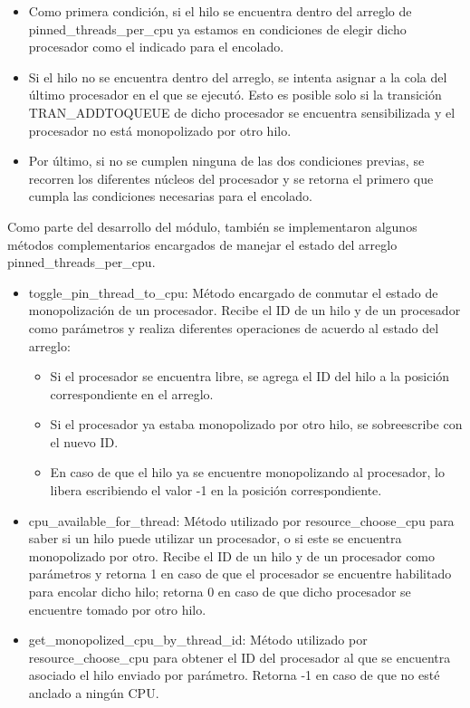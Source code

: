 \begin{itemize}
    \item Como primera condición, si el hilo se encuentra dentro del arreglo de pinned\_threads\_per\_cpu ya estamos en condiciones de elegir dicho procesador como el indicado para el encolado.
    \item Si el hilo no se encuentra dentro del arreglo, se intenta asignar a la cola del último procesador en el que se ejecutó. Esto es posible solo si la transición TRAN\_ADDTOQUEUE de dicho procesador se encuentra sensibilizada y el procesador no está monopolizado por otro hilo.
    \item Por último, si no se cumplen ninguna de las dos condiciones previas, se recorren los diferentes núcleos del procesador y se retorna el primero que cumpla las condiciones necesarias para el encolado.
\end{itemize}

Como parte del desarrollo del módulo, también se implementaron algunos métodos complementarios encargados de manejar el estado del arreglo  pinned\_threads\_per\_cpu.

\begin{itemize}
    \item toggle\_pin\_thread\_to\_cpu: Método encargado de conmutar el estado de monopolización de un procesador. Recibe el ID de un hilo y de un procesador como parámetros y realiza diferentes operaciones de acuerdo al estado del arreglo:
    \begin{itemize}
        \item Si el procesador se encuentra libre, se agrega el ID del hilo a la posición correspondiente en el arreglo.
        \item Si el procesador ya estaba monopolizado por otro hilo, se sobreescribe con el nuevo ID.
        \item En caso de que el hilo ya se encuentre monopolizando al procesador, lo libera escribiendo el valor -1 en la posición correspondiente.
    \end{itemize}
    \item cpu\_available\_for\_thread: Método utilizado por resource\_choose\_cpu para saber si un hilo puede utilizar un procesador, o si este se encuentra monopolizado por otro. Recibe el ID de un hilo y de un procesador como parámetros y retorna 1 en caso de que el procesador se encuentre habilitado para encolar dicho hilo; retorna 0 en caso de que dicho procesador se encuentre tomado por otro hilo.
    \item get\_monopolized\_cpu\_by\_thread\_id: Método utilizado por resource\_choose\_cpu para obtener el ID del procesador al que se encuentra asociado el hilo enviado por parámetro. Retorna -1 en caso de que no esté anclado a ningún CPU.
\end{itemize}

